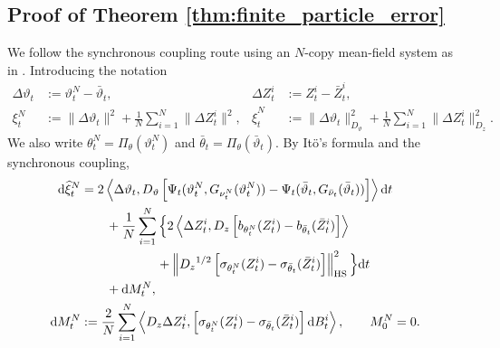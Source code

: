 \subsection{Proof of Theorem \ref{thm:finite_particle_error}}\label{app:proof_finite_particle_error}
We follow the synchronous coupling route using an $N$-copy mean-field system as in \citet{pgd_theory}. Introducing the notation
\[
\begin{aligned}
    \Delta\vartheta_t&:=\vartheta_t^N-\bar\vartheta_t,
    &
    \Delta Z_t^i&:=Z_t^i-\bar Z_t^i,\\
    \xi_t^N
    &:=
    \|\Delta\vartheta_t\|^2
    +
    \frac1N\sum_{i=1}^N\|\Delta Z_t^i\|^2,
    &
    \widehat\xi_t^N
    &:=
    \|\Delta\vartheta_t\|_{D_\vartheta}^2
    +
    \frac1N\sum_{i=1}^N\|\Delta Z_t^i\|_{{D_z}}^2.
\end{aligned}
\]
We also write $\theta^N_t=\Pi_\theta(\vartheta^N_t)$ and $\bar\theta_t=\Pi_\theta(\bar\vartheta_t)$. By It\"o's formula and the synchronous coupling,
\begin{align*}
    \mathrm{d} \widehat\xi_t^N
&= 
2\left\langle
    \Delta\vartheta_t,
    D_\vartheta
    \left[
    \Psi_t(\vartheta_t^N,G_{\nu_t^N}(\vartheta_t^N))
    -
    \Psi_t(\bar\vartheta_t,G_{\bar\nu_t}(\bar\vartheta_t))
    \right]
\right\rangle \mathrm{d} t\\
&\qquad+
\frac1N\sum_{i=1}^N
\Big\{
2\left\langle
    \Delta Z_t^i,
    {D_z}
    \left[
    b_{\theta^N_t}(Z_t^i)
    -
    b_{\bar\theta_t}(\bar Z_t^i)
    \right]
\right\rangle\\
&\qquad\qquad\qquad+
\left\|
    {D_z}^{1/2}
    \left[
    \sigma_{\theta^N_t}(Z_t^i)
    -
    \sigma_{\bar\theta_t}(\bar Z_t^i)
    \right]
\right\|_{\mathrm{HS}}^2
\Big\} \mathrm{d} t\\
&\qquad + \mathrm{d} M^N_t,\\
\mathrm{d} M^N_t&:=\frac{2}{N}\sum_{i=1}^N\left\langle D_z\Delta Z^i_t,\left[
    \sigma_{\theta^N_t}(Z_t^i)
    -
    \sigma_{\bar\theta_t}(\bar Z_t^i)
    \right]\mathrm{d} B^i_t\right\rangle,\qquad M^N_0=0.
\end{align*}

